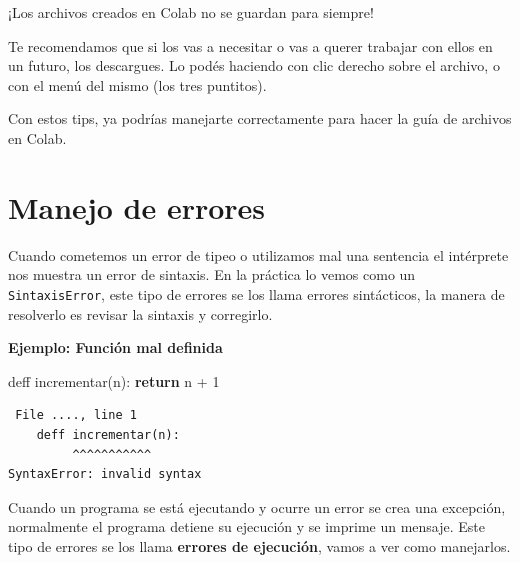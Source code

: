 \documentclass[
  letterpaper,
  DIV=11,
  numbers=noendperiod]{scrreprt}
\newenvironment{Shaded}{\begin{snugshade}}{\end{snugshade}}
\newcommand{\ControlFlowTok}[1]{\textcolor[rgb]{0.00,0.23,0.31}{\textbf{#1}}}
\newcommand{\DecValTok}[1]{\textcolor[rgb]{0.68,0.00,0.00}{#1}}
\newcommand{\NormalTok}[1]{\textcolor[rgb]{0.00,0.23,0.31}{#1}}
\newcommand{\OperatorTok}[1]{\textcolor[rgb]{0.37,0.37,0.37}{#1}}
\begin{document}
\begin{tcolorbox}[enhanced jigsaw, arc=.35mm, toptitle=1mm, colframe=quarto-callout-warning-color-frame, bottomtitle=1mm, opacitybacktitle=0.6, colbacktitle=quarto-callout-warning-color!10!white, leftrule=.75mm, coltitle=black, toprule=.15mm, titlerule=0mm, title=\textcolor{quarto-callout-warning-color}{\faExclamationTriangle}\hspace{0.5em}{Warning}, bottomrule=.15mm, rightrule=.15mm, colback=white, breakable, opacityback=0, left=2mm]

¡Los archivos creados en Colab no se guardan para siempre!

Te recomendamos que si los vas a necesitar o vas a querer trabajar con
ellos en un futuro, los descargues. Lo podés haciendo con clic derecho
sobre el archivo, o con el menú del mismo (los tres puntitos).

\end{tcolorbox}

Con estos tips, ya podrías manejarte correctamente para hacer la guía de
archivos en Colab.

\section{Manejo de errores}\label{manejo-de-errores}

Cuando cometemos un error de tipeo o utilizamos mal una sentencia el
intérprete nos muestra un error de sintaxis. En la práctica lo vemos
como un \texttt{SintaxisError}, este tipo de errores se los llama
errores sintácticos, la manera de resolverlo es revisar la sintaxis y
corregirlo.

\textbf{Ejemplo: Función mal definida}

\begin{Shaded}
\begin{Highlighting}[]
\NormalTok{deff incrementar(n):}
  \ControlFlowTok{return}\NormalTok{ n }\OperatorTok{+} \DecValTok{1}
\end{Highlighting}
\end{Shaded}

\begin{verbatim}
 File ...., line 1
    deff incrementar(n):
         ^^^^^^^^^^^
SyntaxError: invalid syntax
\end{verbatim}

Cuando un programa se está ejecutando y ocurre un error se crea una
excepción, normalmente el programa detiene su ejecución y se imprime un
mensaje. Este tipo de errores se los llama \textbf{errores de
ejecución}, vamos a ver como manejarlos.
\end{document}
